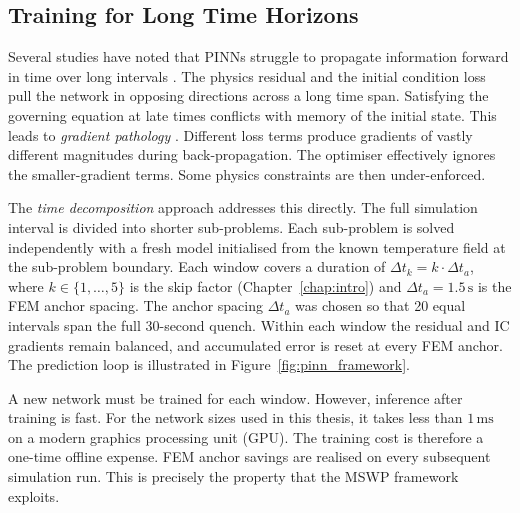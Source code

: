 \subsection{Training for Long Time Horizons}

Several studies have noted that PINNs struggle to propagate information
forward in time over long intervals \cite{wang2021,krishnapriyan2021}.
The physics residual and the initial condition loss pull the network in
opposing directions across a long time span.
Satisfying the governing equation at late times conflicts with memory of the
initial state.
This leads to \emph{gradient pathology} \cite{wang2022ntk,mcclenny2023}.
Different loss terms produce gradients of vastly different magnitudes during
back-propagation.
The optimiser effectively ignores the smaller-gradient terms.
Some physics constraints are then under-enforced.

The \emph{time decomposition} approach addresses this directly.
The full simulation interval is divided into shorter sub-problems.
Each sub-problem is solved independently with a fresh model initialised from
the known temperature field at the sub-problem boundary.
Each window covers a duration of $\Delta t_k = k \cdot \Delta t_a$, where
$k \in \{1,\ldots,5\}$ is the skip factor (Chapter~\ref{chap:intro}) and
$\Delta t_a = 1.5\,\mathrm{s}$ is the FEM anchor spacing.
The anchor spacing $\Delta t_a$ was chosen so that 20 equal intervals span the
full 30-second quench.
Within each window the residual and IC gradients remain balanced, and
accumulated error is reset at every FEM anchor.
The prediction loop is illustrated in Figure~\ref{fig:pinn_framework}.

A new network must be trained for each window.
However, inference after training is fast.
For the network sizes used in this thesis, it takes less than
$1\,\mathrm{ms}$ on a modern graphics processing unit (GPU).
The training cost is therefore a one-time offline expense.
FEM anchor savings are realised on every subsequent simulation run.
This is precisely the property that the MSWP framework exploits.

